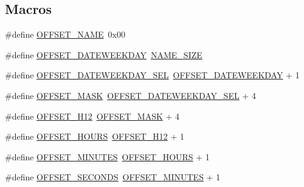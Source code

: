 \subsection*{Macros}
\begin{DoxyCompactItemize}
\item 
\#define \hyperlink{group___clock__management__alarm__offset_ga9986a274242ed1976ceb6af6a314e424}{O\+F\+F\+S\+E\+T\+\_\+\+N\+A\+ME}~0x00
\item 
\#define \hyperlink{group___clock__management__alarm__offset_ga4c2226ae357827da27e35a5b27472c80}{O\+F\+F\+S\+E\+T\+\_\+\+D\+A\+T\+E\+W\+E\+E\+K\+D\+AY}~\hyperlink{group___clock__management__constants_ga834e9a379307f869a10f4da078be5786}{N\+A\+M\+E\+\_\+\+S\+I\+ZE}
\item 
\#define \hyperlink{group___clock__management__alarm__offset_ga9eddc8221941f855965c838c15760731}{O\+F\+F\+S\+E\+T\+\_\+\+D\+A\+T\+E\+W\+E\+E\+K\+D\+A\+Y\+\_\+\+S\+EL}~\hyperlink{group___clock__management__alarm__offset_ga4c2226ae357827da27e35a5b27472c80}{O\+F\+F\+S\+E\+T\+\_\+\+D\+A\+T\+E\+W\+E\+E\+K\+D\+AY} + 1
\item 
\#define \hyperlink{group___clock__management__alarm__offset_ga9d6fc23740ab9f37272a3299949d3c11}{O\+F\+F\+S\+E\+T\+\_\+\+M\+A\+SK}~\hyperlink{group___clock__management__alarm__offset_ga9eddc8221941f855965c838c15760731}{O\+F\+F\+S\+E\+T\+\_\+\+D\+A\+T\+E\+W\+E\+E\+K\+D\+A\+Y\+\_\+\+S\+EL} + 4
\item 
\#define \hyperlink{group___clock__management__alarm__offset_ga1153cc94aac429322a110eb8ea996733}{O\+F\+F\+S\+E\+T\+\_\+\+H12}~\hyperlink{group___clock__management__alarm__offset_ga9d6fc23740ab9f37272a3299949d3c11}{O\+F\+F\+S\+E\+T\+\_\+\+M\+A\+SK} + 4
\item 
\#define \hyperlink{group___clock__management__alarm__offset_ga0447fe94b3055242905c1ef82da6ce75}{O\+F\+F\+S\+E\+T\+\_\+\+H\+O\+U\+RS}~\hyperlink{group___clock__management__alarm__offset_ga1153cc94aac429322a110eb8ea996733}{O\+F\+F\+S\+E\+T\+\_\+\+H12} + 1
\item 
\#define \hyperlink{group___clock__management__alarm__offset_gafffbfcb2669e65a487510c041aee5f06}{O\+F\+F\+S\+E\+T\+\_\+\+M\+I\+N\+U\+T\+ES}~\hyperlink{group___clock__management__alarm__offset_ga0447fe94b3055242905c1ef82da6ce75}{O\+F\+F\+S\+E\+T\+\_\+\+H\+O\+U\+RS} + 1
\item 
\#define \hyperlink{group___clock__management__alarm__offset_ga9d48129268662bd4afbc63795d117ba8}{O\+F\+F\+S\+E\+T\+\_\+\+S\+E\+C\+O\+N\+DS}~\hyperlink{group___clock__management__alarm__offset_gafffbfcb2669e65a487510c041aee5f06}{O\+F\+F\+S\+E\+T\+\_\+\+M\+I\+N\+U\+T\+ES} + 1
\end{DoxyCompactItemize}


